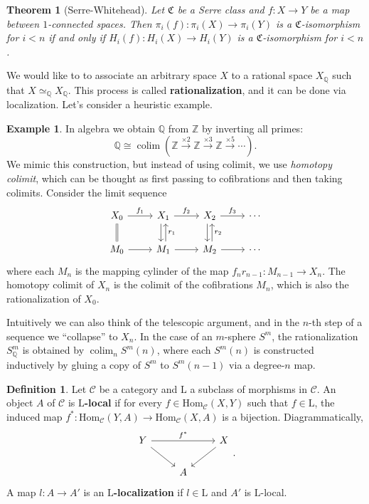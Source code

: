 \documentclass[psamsfonts]{amsart}
\newtheorem{thm}{Theorem}[section]
\theoremstyle{definition}
\newtheorem{defn}{Definition}[section]
\newtheorem{exmp}{Example}[section]
\newcommand{\Q}{\mathbb{Q}}
\newcommand{\Z}{\mathbb{Z}}
\newcommand{\Hom}{\mathrm{Hom}}
\DeclareMathOperator{\colim}{colim}
\numberwithin{equation}{section}
\begin{document}
\begin{thm}[Serre-Whitehead]
Let $\mathfrak{C}$ be a Serre class and $f:X\to Y$ be a map between $1$-connected spaces. Then $\pi_i(f):\pi_i(X)\to\pi_i(Y)$ is a $\mathfrak{C}$-isomorphism for $i<n$ if and only if $H_i(f):H_i(X)\to H_i(Y)$ is a $\mathfrak{C}$-isomorphism for $i<n$.
\end{thm}

We would like to to associate an arbitrary space $X$ to a rational space $X_\Q$ such that $X\simeq_\Q X_\Q$. This process is called \textbf{rationalization}, and it can be done via localization. Let's consider a heuristic example.

\begin{exmp}

In algebra we obtain $\Q$ from $\Z$ by inverting all primes:
\[\Q\cong\colim\left(\Z\xrightarrow{\times2}\Z\xrightarrow{\times3}\Z\xrightarrow{\times5}\cdots\right).\]
We mimic this construction, but instead of using colimit, we use \textit{homotopy colimit}, which can be thought as first passing to cofibrations and then taking colimits. %
Consider the limit sequence
\[\begin{tikzcd}
X_0\arrow[d,equal]\arrow[r,"f_1"]&X_1\arrow[d,shift right]\arrow[r,"f_2"]&X_2\arrow[d,shift right]\arrow[r,"f_3"]&\cdots\\
M_0\arrow[r]&M_1\arrow[u,"r_1"',shift right]\arrow[r]&M_2\arrow[u,"r_2"',shift right]\arrow[r]&\cdots
\end{tikzcd}\]
where each $M_n$ is the mapping cylinder of the map $f_nr_{n-1}:M_{n-1}\to X_n$. The homotopy colimit of $X_n$ is the colimit of the cofibrations $M_n$, which is also the rationalization of $X_0$.

Intuitively we can also think of the telescopic argument, and in the $n$-th step of a sequence we ``collapse'' to $X_n$. In the case of an $m$-sphere $S^m$, the rationalization $S^m_\Q$ is obtained by $\colim_n{S^m(n)}$, where each $S^m(n)$ is constructed inductively by gluing a copy of $S^m$ to $S^m(n-1)$ via a degree-$n$ map.
\end{exmp}

\begin{defn}
Let $\mathcal{C}$ be a category and $\mathrm{L}$ a subclass of morphisms in $\mathcal{C}$. An object $A$ of $\mathcal{C}$ is \textbf{$\mathrm{L}$-local} if for every $f\in\Hom_\mathcal{C}(X,Y)$ such that $f\in\mathrm{L}$, the induced map $f^\ast:\Hom_\mathcal{C}(Y,A)\to\Hom_\mathcal{C}(X,A)$ is a bijection. Diagrammatically,
\[\begin{tikzcd}
Y\arrow[dr]\arrow[rr,"f^\ast"]&&X\arrow[dl]\\
&A
\end{tikzcd}.\]
A map $l:A\to A'$ is an \textbf{$\mathrm{L}$-localization} if $l\in\mathrm{L}$ and $A'$ is $\mathrm{L}$-local.
\end{defn}
\end{document}
